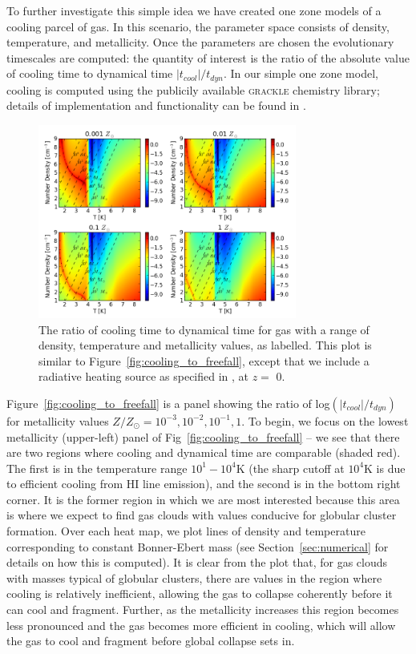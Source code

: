 \documentclass[useAMS,usenatbib]{mn2e}
\begin{document}
To further investigate this simple idea we have created one zone models of a cooling parcel of gas. In  this scenario, the parameter space consists of density, temperature, and metallicity. Once the parameters are chosen the evolutionary timescales are computed: the quantity of interest is the ratio of the absolute value of cooling time to dynamical time $|t_{cool}|/t_{dyn}$. In our simple one zone model, cooling is computed using the publicily available \textsc{grackle} chemistry library; details of implementation and functionality can be found
in \cite{Bryan2014}.

\begin{figure}
\begin{center}
\mbox{\includegraphics[width=8.5cm]{Images/cooling_to_freefall}}
\end{center}
\caption{\label{fig:cooling_to_freefall_background} The ratio of cooling time to dynamical time for gas with a range of density, temperature and metallicity values, as labelled.  This plot is similar to Figure~\ref{fig:cooling_to_freefall}, except that we include a radiative heating source as specified in \citet{Haardt2012}, at $z=$ 0.}
\end{figure}

Figure~\ref{fig:cooling_to_freefall} is a panel showing the ratio of log$(|t_{cool}|/t_{dyn})$ for metallicity values $Z/Z_{\odot}=10^{-3},10^{-2},10^{-1},1$.  To begin, we focus on the lowest metallicity  (upper-left) panel of Fig~\ref{fig:cooling_to_freefall} -- we see that there are two regions where cooling and dynamical time are comparable (shaded red). The first is in the temperature range $10^1-10^4$K (the sharp cutoff at $10^4$K is due to efficient cooling from HI line emission), and the second is in the bottom right corner. It is the former region in which we are most interested because this area is where we expect to find gas clouds with values conducive for globular cluster formation. Over each heat map, we plot lines of density and temperature corresponding to constant Bonner-Ebert mass (see Section~\ref{sec:numerical} for details on how this is computed). It is clear from the plot that, for gas clouds with masses typical of globular clusters, there are values in the region where cooling is relatively inefficient, allowing the gas to collapse coherently before it can cool and fragment. Further, as the metallicity increases this region becomes less pronounced and the gas becomes more efficient in cooling, which will allow the gas to cool and fragment before global collapse sets in.
\end{document}
